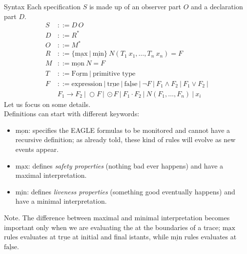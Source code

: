 \documentclass[aspectratio=169,t,xcolor=table]{beamer}
\begin{document}
\begin{frame}[allowframebreaks]{Syntax}
    Each specification $S$ is made up of an observer part $O$ and a declaration part $D$.
    \begin{align*}
    S &::= D \, O \\
    D &::= R^* \\
    O &::= M^* \\
    R &::= \{\underline{\text{max}}\ |\ \underline{\text{min}} \}\ N(T_1\ x_1, \ldots, T_n\ x_n) = F \\
    M &::= \underline{\text{mon}}\ N = F \\
    T &::= \underline{\text{Form}}\ |\ \text{primitive type} \\
    F &::= \text{expression}\ |\ \underline{\text{true}}\ |\ \underline{\text{false}}\ |\ \neg F\ |\ F_1 \land F_2\ |\ F_1 \lor F_2\ |\\
            &F_1 \rightarrow F_2\ |\ \bigcirc F\ |\ \odot F\ |\ F_1 \cdot F_2\ |\ N(F_1, \ldots, F_n)\ |\ x_i
    \end{align*}
    Let us focus on some details.\\
    Definitions can start with different keywords:
    \begin{itemize}
        \item $\underline{\text{mon}}$: specifies the EAGLE formulas to be monitored and cannot have a recursive definition; as already told, these kind of rules will evolve as new events appear.
        \item $\underline{\text{max}}$: defines \textit{safety properties} (nothing bad ever happens) and have a maximal interpretation.
        \item $\underline{\text{min}}$: defines \textit{liveness properties} (something good eventually happens) and have a minimal interpretation.
    \end{itemize}

    \begin{block}{Note.}    
        The difference between maximal and minimal interpretation becomes important only when we are evaluating the at the boundaries of a trace; $\underline{\text{max}}$ rules evaluates at $\underline{\text{true}}$ at initial and final istants, while $\underline{\text{min}}$ rules evaluates at $\underline{\text{false}}$.
    \end{block}    
\end{frame}
\end{document}

